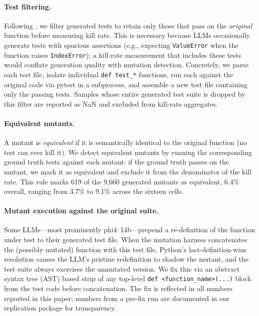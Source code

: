 \documentclass[smallextended]{svjour3}
\begin{document}
\paragraph{Test filtering.}
Following \citet{andrews2005}, we filter generated tests to retain
only those that pass on the \emph{original} function before
measuring kill rate. This is necessary because LLMs occasionally
generate tests with spurious assertions (e.g., expecting
\texttt{ValueError} when the function raises \texttt{IndexError});
a kill-rate measurement that includes these tests would conflate
generation quality with mutation detection. Concretely, we parse
each test file, isolate individual \texttt{def test\_*} functions,
run each against the original code via pytest in a subprocess, and
assemble a new test file containing only the passing tests. Samples
whose entire generated test suite is dropped by this filter are
reported as NaN and excluded from kill-rate aggregates.

\paragraph{Equivalent mutants.}
A mutant is \emph{equivalent} if it is semantically identical to the
original function (no test can ever kill it). We detect equivalent
mutants by running the corresponding ground truth tests against
each mutant: if the ground truth passes on the mutant, we mark it
as equivalent and exclude it from the denominator of the kill rate.
This rule marks 619 of the 9{,}660 generated mutants as
equivalent, 6.4\% overall, ranging from 3.7\% to 9.1\% across the
sixteen cells.

\paragraph{Mutant execution against the original suite.}
Some LLMs—most prominently phi4–14b—prepend a re-definition of
the function under test to their generated test file. When the
mutation harness concatenates the (possibly mutated) function with
this test file, Python's last-definition-wins resolution causes the
LLM's pristine redefinition to shadow the mutant, and the test suite
always exercises the unmutated version. We fix this via an
abstract syntax tree (AST) based strip of any top-level
\texttt{def <function\_name>(...)} block from the test code before
concatenation. The fix is reflected in all
numbers reported in this paper; numbers from a pre-fix run are
documented in our replication package for transparency.
\end{document}
